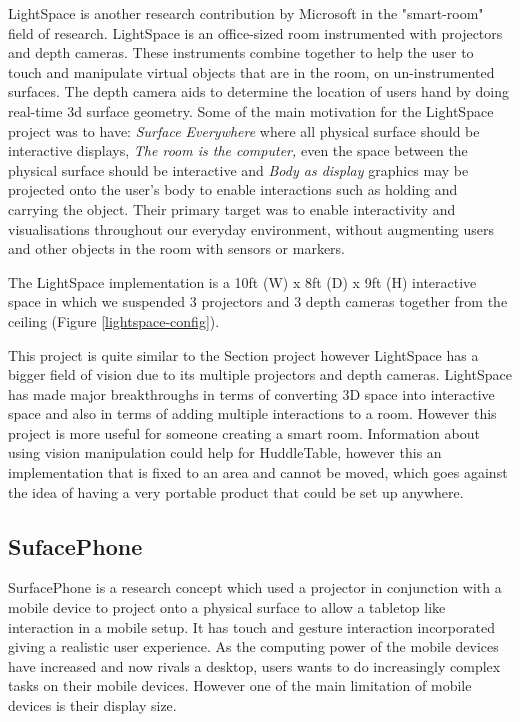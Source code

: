 LightSpace is another research contribution by Microsoft in the "smart-room" field of research\cite{lightspace}. LightSpace is an office-sized room instrumented with projectors and depth cameras. These instruments combine together to help the user to touch and manipulate virtual objects that are in the room, on un-instrumented surfaces. The depth camera aids to determine the location of users hand by doing real-time 3d surface geometry. Some of the main motivation for the LightSpace project was to have: 
\emph{Surface Everywhere} where all physical surface should be interactive displays, 
\emph{The room is the computer,} even the space between the physical surface should be interactive and 
\emph{Body as display} graphics may be projected onto the user's body to enable interactions such as holding and carrying the object.
Their primary target was to enable interactivity and visualisations throughout our everyday environment, without augmenting users and other objects in the room with sensors or markers\cite{lightspace}.

The LightSpace implementation is  a 10ft (W) x 8ft (D) x 9ft (H) interactive space in which we suspended 3 projectors and 3 depth cameras together from the ceiling (Figure \ref{lightspace-config})\cite{lightspace}.

This project is quite similar to the Section  project however LightSpace has a bigger field of vision due to its multiple projectors and depth cameras. LightSpace has made major breakthroughs in terms of converting 3D space into interactive space and also in terms of adding multiple interactions to a room. However this project is more useful for someone creating a smart room. Information about using vision manipulation could help for HuddleTable, however this an implementation that is fixed to an area and cannot be moved, which goes against the idea of having a very portable product that could be set up anywhere. 

\subsection{SufacePhone}

SurfacePhone\cite{surfacephone} is a research concept which used
a projector in conjunction with a mobile device to project onto a
physical surface to allow a tabletop like interaction in a mobile setup.
It has touch and gesture interaction incorporated giving a
realistic user experience. As the computing power of the mobile devices have
increased and now rivals a desktop, users wants to do increasingly complex
tasks on their mobile devices. However one of the main limitation
of mobile devices is their display size. 

